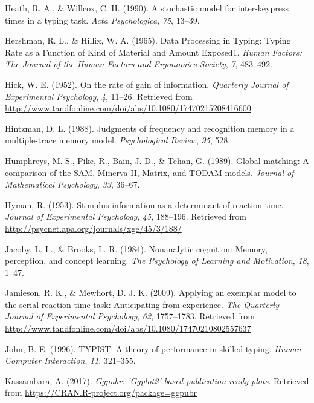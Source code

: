 \documentclass[floatsintext,man]{apa6}
\theoremstyle{definition}
\theoremstyle{definition}
\theoremstyle{definition}
\theoremstyle{remark}
\begin{document}
\hypertarget{ref-heath_stochastic_1990}{}
Heath, R. A., \& Willcox, C. H. (1990). A stochastic model for
inter-keypress times in a typing task. \emph{Acta Psychologica},
\emph{75}, 13--39.

\hypertarget{ref-HershmanDataProcessingTyping1965}{}
Hershman, R. L., \& Hillix, W. A. (1965). Data Processing in Typing:
Typing Rate as a Function of Kind of Material and Amount Exposed1.
\emph{Human Factors: The Journal of the Human Factors and Ergonomics
Society}, \emph{7}, 483--492.

\hypertarget{ref-hick_rate_1952}{}
Hick, W. E. (1952). On the rate of gain of information. \emph{Quarterly
Journal of Experimental Psychology}, \emph{4}, 11--26. Retrieved from
\url{http://www.tandfonline.com/doi/abs/10.1080/17470215208416600}

\hypertarget{ref-hintzman_judgments_1988}{}
Hintzman, D. L. (1988). Judgments of frequency and recognition memory in
a multiple-trace memory model. \emph{Psychological Review}, \emph{95},
528.

\hypertarget{ref-humphreys_global_1989}{}
Humphreys, M. S., Pike, R., Bain, J. D., \& Tehan, G. (1989). Global
matching: A comparison of the SAM, Minerva II, Matrix, and TODAM models.
\emph{Journal of Mathematical Psychology}, \emph{33}, 36--67.

\hypertarget{ref-hyman_stimulus_1953}{}
Hyman, R. (1953). Stimulus information as a determinant of reaction
time. \emph{Journal of Experimental Psychology}, \emph{45}, 188--196.
Retrieved from \url{http://psycnet.apa.org/journals/xge/45/3/188/}

\hypertarget{ref-JacobyNonanalyticcognitionMemory1984}{}
Jacoby, L. L., \& Brooks, L. R. (1984). Nonanalytic cognition: Memory,
perception, and concept learning. \emph{The Psychology of Learning and
Motivation}, \emph{18}, 1--47.

\hypertarget{ref-jamieson_applying_2009}{}
Jamieson, R. K., \& Mewhort, D. J. K. (2009). Applying an exemplar model
to the serial reaction-time task: Anticipating from experience.
\emph{The Quarterly Journal of Experimental Psychology}, \emph{62},
1757--1783. Retrieved from
\url{http://www.tandfonline.com/doi/abs/10.1080/17470210802557637}

\hypertarget{ref-john_typist:_1996}{}
John, B. E. (1996). TYPIST: A theory of performance in skilled typing.
\emph{Human-Computer Interaction}, \emph{11}, 321--355.

\hypertarget{ref-R-ggpubr}{}
Kassambara, A. (2017). \emph{Ggpubr: 'Ggplot2' based publication ready
plots}. Retrieved from \url{https://CRAN.R-project.org/package=ggpubr}
\end{document}
